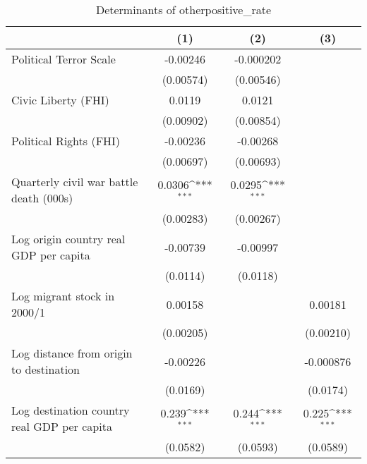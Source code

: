 \begin{table}[htbp]\centering
\def\sym#1{\ifmmode^{#1}\else\(^{#1}\)\fi}
\caption{Determinants of otherpositive\_rate}
\begin{tabular}{l*{3}{c}}
\hline\hline
                    &\multicolumn{1}{c}{(1)}         &\multicolumn{1}{c}{(2)}         &\multicolumn{1}{c}{(3)}         \\
\hline
Political Terror Scale&    -0.00246         &   -0.000202         &                     \\
                    &   (0.00574)         &   (0.00546)         &                     \\
[1em]
Civic Liberty (FHI) &      0.0119         &      0.0121         &                     \\
                    &   (0.00902)         &   (0.00854)         &                     \\
[1em]
Political Rights (FHI)&    -0.00236         &    -0.00268         &                     \\
                    &   (0.00697)         &   (0.00693)         &                     \\
[1em]
Quarterly civil war battle death (000s)&      0.0306\sym{***}&      0.0295\sym{***}&                     \\
                    &   (0.00283)         &   (0.00267)         &                     \\
[1em]
Log origin country real GDP per capita&    -0.00739         &    -0.00997         &                     \\
                    &    (0.0114)         &    (0.0118)         &                     \\
[1em]
Log migrant stock in 2000/1&     0.00158         &                     &     0.00181         \\
                    &   (0.00205)         &                     &   (0.00210)         \\
[1em]
Log distance from origin to destination&    -0.00226         &                     &   -0.000876         \\
                    &    (0.0169)         &                     &    (0.0174)         \\
[1em]
Log destination country real GDP per capita&       0.239\sym{***}&       0.244\sym{***}&       0.225\sym{***}\\
                    &    (0.0582)         &    (0.0593)         &    (0.0589)         \\

\end{tabular}
\end{table}
